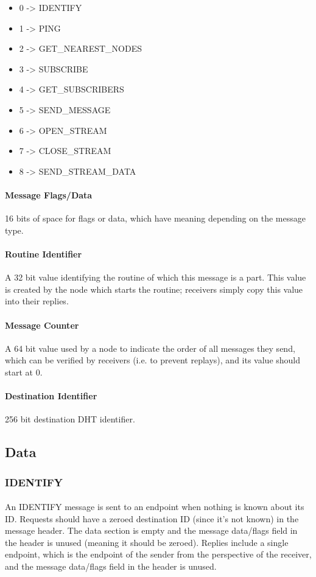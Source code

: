 \documentclass{article}
\begin{document}
\begin{itemize}
\item 0 -> IDENTIFY
\item 1 -> PING
\item 2 -> GET_NEAREST_NODES
\item 3 -> SUBSCRIBE
\item 4 -> GET_SUBSCRIBERS
\item 5 -> SEND_MESSAGE
\item 6 -> OPEN_STREAM
\item 7 -> CLOSE_STREAM
\item 8 -> SEND_STREAM_DATA
\end{itemize}

\paragraph{Message Flags/Data}
16 bits of space for flags or data, which have meaning depending on the message type.

\paragraph{Routine Identifier}
A 32 bit value identifying the routine of which this message is a part. This value is created by the node which starts the routine; receivers simply copy this value into their replies.

\paragraph{Message Counter}
A 64 bit value used by a node to indicate the order of all messages they send, which can be verified by receivers (i.e. to prevent replays), and its value should start at 0.

\paragraph{Destination Identifier}
256 bit destination DHT identifier.

\subsection{Data}

\subsubsection{IDENTIFY}

\paragraph{}
An IDENTIFY message is sent to an endpoint when nothing is known about its ID.
Requests should have a zeroed destination ID (since it's not known) in the message header. The data section is empty and the message data/flags field in the header is unused (meaning it should be zeroed).
Replies include a single endpoint, which is the endpoint of the sender from the perspective of the receiver, and the message data/flags field in the header is unused.
\end{document}
